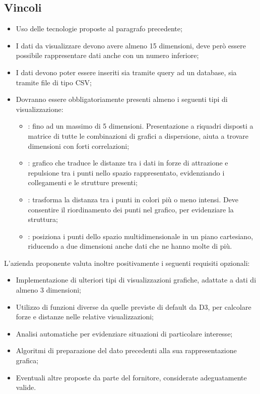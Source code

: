 \subsection{Vincoli}
\begin{itemize}
\item Uso delle tecnologie proposte al paragrafo precedente;
\item I dati da visualizzare devono avere almeno 15 dimensioni, deve però essere possibile rappresentare dati anche con un numero inferiore;
\item I dati devono poter essere inseriti sia tramite query ad un database, sia tramite file di tipo CSV;
\item Dovranno essere obbligatoriamente presenti almeno i seguenti tipi di visualizzazione:
\begin{itemize}
\item {}: fino ad un massimo di 5 dimensioni. Presentazione a riquadri disposti a matrice di tutte le combinazioni di grafici a dispersione, aiuta a trovare dimensioni con forti correlazioni;
\item {}: grafico che traduce le distanze tra i dati in forze di attrazione e repulsione tra i punti nello spazio rappresentato, evidenziando i collegamenti e le strutture presenti;
\item {}: trasforma la distanza tra i punti in colori più o meno intensi. Deve consentire il riordinamento dei punti nel grafico, per evidenziare la struttura;
\item {}: posiziona i punti dello spazio multidimensionale in un piano cartesiano, riducendo a due dimensioni anche dati che ne hanno molte di più.
\end{itemize}
\end{itemize}
L’azienda proponente valuta inoltre positivamente i seguenti requisiti opzionali:
\begin{itemize}    
\item Implementazione di ulteriori tipi di visualizzazioni grafiche, adattate a dati di almeno 3 dimensioni;
\item Utilizzo di funzioni diverse da quelle previste di default da D3, per calcolare forze e distanze nelle relative visualizzazioni;
\item Analisi automatiche per evidenziare situazioni di particolare interesse;
\item Algoritmi di preparazione del dato precedenti alla sua rappresentazione grafica;
\item Eventuali altre proposte da parte del fornitore, considerate adeguatamente valide.
\end{itemize}

